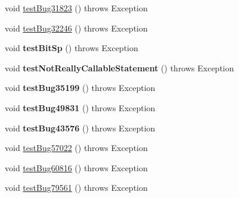 \begin{DoxyCompactItemize}
\item 
void \mbox{\hyperlink{classtestsuite_1_1regression_1_1_callable_statement_regression_test_a28a91e6259cced18e90ef08947170c38}{test\+Bug31823}} ()  throws Exception 
\item 
void \mbox{\hyperlink{classtestsuite_1_1regression_1_1_callable_statement_regression_test_ae409019fbd71b0dbfac43b3a30ed326e}{test\+Bug32246}} ()  throws Exception 
\item 
\mbox{\label{classtestsuite_1_1regression_1_1_callable_statement_regression_test_a62d50b9afe5d1c0ea97602443566a8b7}} 
void {\bfseries test\+Bit\+Sp} ()  throws Exception 
\item 
\mbox{\label{classtestsuite_1_1regression_1_1_callable_statement_regression_test_a4ec3dd37af3e283e5fd49d2337ff02b3}} 
void {\bfseries test\+Not\+Really\+Callable\+Statement} ()  throws Exception 
\item 
\mbox{\label{classtestsuite_1_1regression_1_1_callable_statement_regression_test_a179ee076f989c2634e8cd243f235985a}} 
void {\bfseries test\+Bug35199} ()  throws Exception 
\item 
\mbox{\label{classtestsuite_1_1regression_1_1_callable_statement_regression_test_a80c90630b43a2beb90c1aca47ae09ea4}} 
void {\bfseries test\+Bug49831} ()  throws Exception 
\item 
\mbox{\label{classtestsuite_1_1regression_1_1_callable_statement_regression_test_a354d9bdc0017ec0672d80b636718c136}} 
void {\bfseries test\+Bug43576} ()  throws Exception 
\item 
void \mbox{\hyperlink{classtestsuite_1_1regression_1_1_callable_statement_regression_test_a9d71a6ee60ddbf67fdc1efadaca6af56}{test\+Bug57022}} ()  throws Exception 
\item 
void \mbox{\hyperlink{classtestsuite_1_1regression_1_1_callable_statement_regression_test_adf4d392882f055ca081e7af6441af0e5}{test\+Bug60816}} ()  throws Exception 
\item 
void \mbox{\hyperlink{classtestsuite_1_1regression_1_1_callable_statement_regression_test_a0e24518b290873422733e33c74b12bcb}{test\+Bug79561}} ()  throws Exception 

\end{DoxyCompactItemize}
